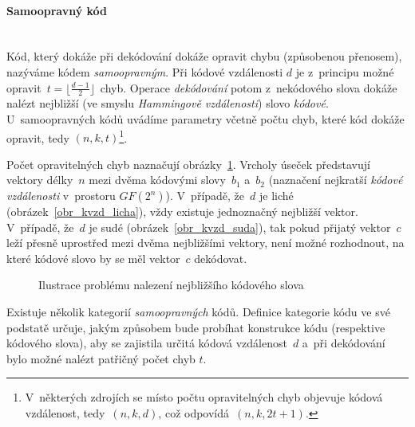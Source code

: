 \documentclass[thesis=M,czech,hidelinks]{FITthesis}[2012/06/26]
\newcommand{\0}{{\textcolor[gray]{0.75}{0}}}
\begin{document}
\paragraph{Samoopravný kód} \hfil \\
Kód, který dokáže při dekódování dokáže opravit chybu (způsobenou přenosem),
nazýváme kódem \emph{samoopravným}. Při kódové vzdálenosti $d$ je z~principu
možné opravit~$t = \lfloor \frac{d-1}{2} \rfloor$~chyb. Operace
\emph{dekódování} potom z~nekódového slova dokáže nalézt nejbližší (ve smyslu
\emph{Hammingově vzdálenosti}) slovo \emph{kódové}. U~samoopravných kódů uvádíme
parametry včetně počtu chyb, které kód dokáže opravit, tedy $(n,k,t)$\footnote{
    V~některých zdrojích se místo počtu opravitelných chyb objevuje kódová
    vzdálenost, tedy~$(n,k,d)$, což odpovídá~$(n,k,2t+1)$.
}.


Počet opravitelných chyb naznačují obrázky~\ref{obr_kvzd}. Vrcholy úseček
představují vektory délky~$n$ mezi dvěma kódovými slovy~$b_1$ a~$b_2$ (naznačení
nejkratší \emph{kódové vzdálenosti} v~prostoru $GF(2^n)$). V~případě, že~$d$ je
liché (obrázek~\ref{obr_kvzd_licha}), vždy existuje jednoznačný nejbližší
vektor. V~případě, že~$d$ je sudé (obrázek~\ref{obr_kvzd_suda}), tak pokud
přijatý vektor~$c$ leží přesně uprostřed mezi dvěma nejbližšími vektory, není
možné rozhodnout, na které kódové slovo by se měl vektor~$c$ dekódovat.

\begin{figure}
    \centering
    \quad
    \caption[Ilustrace kódové vzdálenosti]{
        Ilustrace problému nalezení nejbližšího kódového slova \label{obr_kvzd}
    }
\end{figure}

Existuje několik kategorií \emph{samoopravných} kódů. Definice kategorie kódu ve
své podstatě určuje, jakým způsobem bude probíhat konstrukce kódu (respektive
kódového slova), aby se zajistila určitá kódová vzdálenost~$d$ a~při dekódování
bylo možné nalézt patřičný počet chyb $t$.
\end{document}
